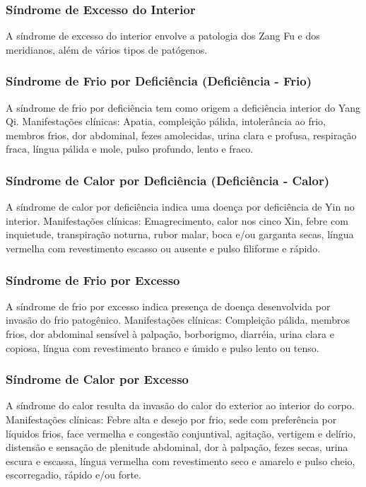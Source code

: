 \documentclass[12pt,oneside,a4paper]{book} %
\begin{document}
\subsubsection{Síndrome de Excesso do Interior}
A síndrome de excesso do interior envolve a patologia dos Zang Fu e dos meridianos, além de vários tipos de patógenos. 

\subsubsection{Síndrome de Frio por Deficiência (Deficiência - Frio)}
A síndrome de frio por deficiência tem como origem a deficiência interior do Yang Qi.
Manifestações clínicas: Apatia, compleição pálida, intolerância ao frio, membros frios, dor abdominal, fezes amolecidas, urina clara e profusa, respiração fraca, língua pálida e mole, pulso profundo, lento e fraco.

\subsubsection{Síndrome de Calor por Deficiência (Deficiência - Calor)}
A síndrome de calor por deficiência indica uma doença por deficiência de Yin no interior.
Manifestações clínicas: Emagrecimento, calor nos cinco Xin, febre com inquietude, transpiração noturna, rubor malar, boca e/ou garganta secas, língua vermelha com revestimento escasso ou ausente e pulso filiforme e rápido.

\subsubsection{Síndrome de Frio por Excesso}
A síndrome de frio por excesso indica presença de doença desenvolvida por invasão do frio patogênico.
Manifestações clínicas: Compleição pálida, membros frios, dor abdominal sensível à palpação, borborigmo, diarréia, urina clara e copiosa, língua com revestimento branco e úmido e pulso lento ou tenso.

\subsubsection{Síndrome de Calor por Excesso}
A síndrome do calor resulta da invasão do calor do exterior ao interior do corpo.
Manifestações clínicas: Febre alta e desejo por frio, sede com preferência por líquidos frios, face vermelha e congestão conjuntival, agitação, vertigem e delírio, distensão e sensação de plenitude abdominal, dor à palpação, fezes secas, urina escura e escassa, língua vermelha com revestimento seco e amarelo e pulso cheio, escorregadio, rápido e/ou forte.
\end{document}
